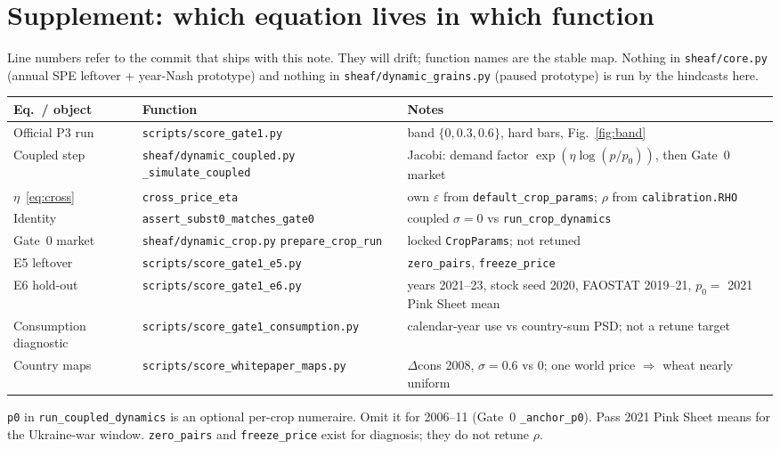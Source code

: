 \section{Supplement: which equation lives in which function}
\label{sec:code}

Line numbers refer to the commit that ships with this note. They will
drift; function names are the stable map. Nothing in
\texttt{sheaf/core.py} (annual SPE leftover + year-Nash prototype) and nothing in
\texttt{sheaf/dynamic\_grains.py} (paused prototype) is run by the
hindcasts here.

\begin{center}
\small
\begin{tabular}{llp{}}
\toprule
Eq.\ / object & Function & Notes \\
\midrule
Official P3 run &
\texttt{scripts/score\_gate1.py} &
band \(\{0,0.3,0.6\}\), hard bars, Fig.~\ref{fig:band} \\
Coupled step &
\texttt{sheaf/dynamic\_coupled.py}
\texttt{\_simulate\_coupled} &
Jacobi: demand factor $\exp(\eta\log(p/p_0))$, then Gate~0 market \\
\(\eta\)~\eqref{eq:cross} &
\texttt{cross\_price\_eta} &
own \(\varepsilon\) from \texttt{default\_crop\_params};
\(\rho\) from \texttt{calibration.RHO} \\
Identity &
\texttt{assert\_subst0\_matches\_gate0} &
coupled \(\sigma=0\) vs \texttt{run\_crop\_dynamics} \\
Gate~0 market &
\texttt{sheaf/dynamic\_crop.py}
\texttt{prepare\_crop\_run} &
locked \texttt{CropParams}; not retuned \\
E5 leftover &
\texttt{scripts/score\_gate1\_e5.py} &
\texttt{zero\_pairs}, \texttt{freeze\_price} \\
E6 hold-out &
\texttt{scripts/score\_gate1\_e6.py} &
years 2021--23, stock seed 2020,
FAOSTAT 2019--21, \(p_0=\) 2021 Pink Sheet mean \\
Consumption diagnostic &
\texttt{scripts/score\_gate1\_consumption.py} &
calendar-year use vs country-sum PSD;
not a retune target \\
Country maps &
\texttt{scripts/score\_whitepaper\_maps.py} &
\(\Delta\)cons 2008, \(\sigma=0.6\) vs \(0\);
one world price \(\Rightarrow\) wheat nearly uniform \\
\bottomrule
\end{tabular}
\end{center}

\texttt{p0} in \texttt{run\_coupled\_dynamics} is an optional per-crop
numeraire. Omit it for 2006--11 (Gate~0 \texttt{\_anchor\_p0}). Pass 2021
Pink Sheet means for the Ukraine-war window. \texttt{zero\_pairs} and
\texttt{freeze\_price} exist for diagnosis; they do not retune \(\rho\).
